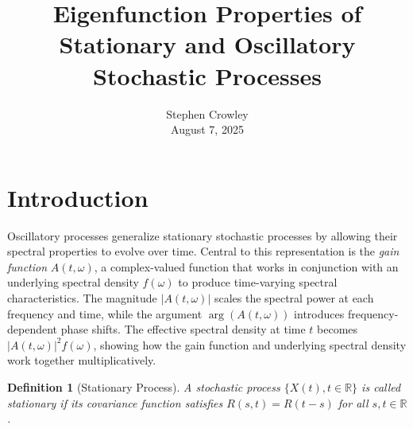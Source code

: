 \documentclass{article}
\newcommand{\tmaffiliation}[1]{\\ #1}
\newcommand{\tmem}[1]{{\em #1\/}}
\newtheorem{definition}{Definition}
\begin{document}
\title{Eigenfunction Properties of Stationary and Oscillatory Stochastic
Processes}

\author{
  Stephen Crowley
  \tmaffiliation{August 7, 2025}
}

\date{}

\maketitle

\section*{Introduction}

Oscillatory processes generalize stationary stochastic processes by allowing
their spectral properties to evolve over time. Central to this representation
is the {\tmem{gain function}} $A (t, \omega)$, a complex-valued function that
works in conjunction with an underlying spectral density $f (\omega)$ to
produce time-varying spectral characteristics. The magnitude $|A (t, \omega)
|$ scales the spectral power at each frequency and time, while the argument
$\arg (A (t, \omega))$ introduces frequency-dependent phase shifts. The
effective spectral density at time $t$ becomes $|A (t, \omega) |^2 f
(\omega)$, showing how the gain function and underlying spectral density work
together multiplicatively.

\begin{definition}
  [Stationary Process] A stochastic process $\{X (t), t \in \mathbb{R}\}$ is
  called stationary if its covariance function satisfies $R (s, t) = R (t -
  s)$ for all $s, t \in \mathbb{R}$.
\end{definition}
\end{document}
